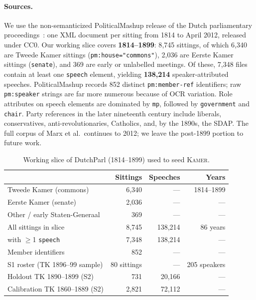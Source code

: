 \documentclass[sigconf,review,anonymous]{acmart}
\newcommand{\sys}{\textsc{Kamer}}
\begin{document}
\paragraph{Sources.} We use the non-semanticized PoliticalMashup release of
the Dutch parliamentary proceedings~\cite{marx2012dutchparl}: one XML
document per sitting from 1814 to April 2012, released under CC0. Our
working slice covers \textbf{1814--1899}: 8{,}745 sittings, of which
6{,}340 are Tweede Kamer sittings (\texttt{pm:house="commons"}), 2{,}036
are Eerste Kamer sittings (\texttt{senate}), and 369 are early or
unlabelled meetings. Of these, 7{,}348 files contain at least one
\texttt{speech} element, yielding \textbf{138{,}214} speaker-attributed
speeches. PoliticalMashup records 852 distinct \texttt{pm:member-ref}
identifiers; raw \texttt{pm:speaker} strings are far more numerous because
of OCR variation. Role attributes on speech elements are dominated by
\texttt{mp}, followed by \texttt{government} and \texttt{chair}. Party
references in the later nineteenth century include liberals,
conservatives, anti-revolutionaries, Catholics, and, by the 1890s, the
SDAP. The full corpus of Marx et al.\ continues to 2012; we leave the
post-1899 portion to future work.

\begin{table}[t]
\caption{Working slice of DutchParl (1814--1899) used to seed \sys{}.}
\label{tab:corpus}
\centering\small
\begin{tabular}{lrrr}
\toprule
 & Sittings & Speeches & Years \\
\midrule
Tweede Kamer (commons) & 6{,}340 & --- & 1814--1899 \\
Eerste Kamer (senate) & 2{,}036 & --- & --- \\
Other / early Staten-Generaal & 369 & --- & --- \\
\midrule
All sittings in slice & 8{,}745 & 138{,}214 & 86 years \\
\quad with $\geq$1 \texttt{speech} & 7{,}348 & 138{,}214 & --- \\
Member identifiers & 852 & --- & --- \\
S1 roster (TK 1896--99 sample) & 80 sittings & --- & 205 speakers \\
Holdout TK 1890--1899 (S2) & 731 & 20{,}166 & --- \\
Calibration TK 1860--1889 (S2) & 2{,}821 & 72{,}112 & --- \\
\bottomrule
\end{tabular}
\end{table}
\end{document}
